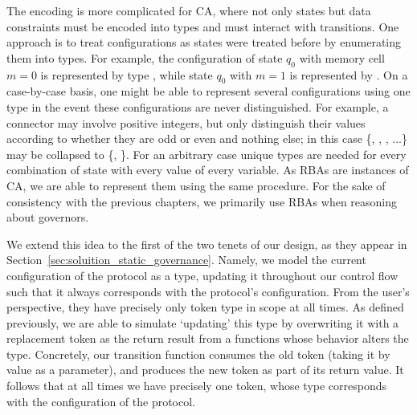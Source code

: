 The encoding is more complicated for CA, where not only states but data constraints must be encoded into types and must interact with transitions. One approach is to treat configurations as states were treated before by enumerating them into types. For example, the configuration of state $q_0$ with memory cell $m=0$ is represented by type , while state $q_0$ with $m=1$ is represented by . On a case-by-case basis, one might be able to represent several configurations using one type in the event these configurations are never distinguished. For example, a connector may involve positive integers, but only distinguish their values according to whether they are odd or even and nothing else; in this case \{, , , ...\} may be collapsed to \{, \}. For an arbitrary case unique types are needed for every combination of state with every value of every variable. As RBAs are instances of CA, we are able to represent them using the same procedure. For the sake of consistency with the previous chapters, we primarily use RBAs when reasoning about governors.

We extend this idea to the first of the two tenets of our design, as they appear in Section~\ref{sec:soluition_static_governance}. Namely, we model the current configuration of the protocol as a type, updating it throughout our control flow such that it always corresponds with the protocol's configuration. From the user's perspective, they have precisely only token type in scope at all times. As defined previously, we are able to simulate `updating' this type by overwriting it with a replacement token as the return result from a functions whose behavior alters the type. Concretely, our transition function consumes the old token (taking it by value as a parameter), and produces the new token as part of its return value. It follows that at all times we have precisely one token, whose type corresponds with the configuration of the protocol.

